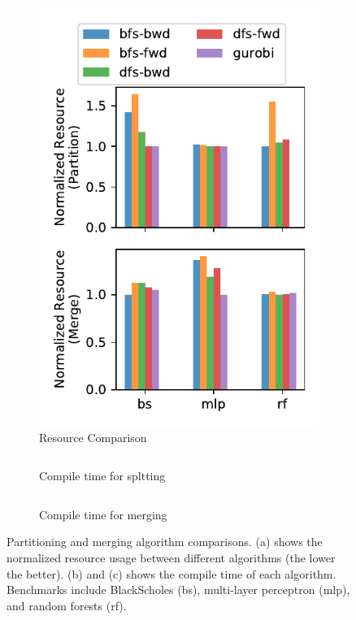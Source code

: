 \begin{figure}
\centering
\hfill
\begin{subfigure}[b]{0.35\textwidth}
\includegraphics[width=1\textwidth]{figs/algo2.pdf}
\caption{Resource Comparison}
\end{subfigure}
\hfill
\begin{subfigure}[b]{0.64\textwidth}
\centering
\begin{tabular}{lccccc}
  \toprule
  
 \bottomrule
\end{tabular}
\caption{
  Compile time for spltting
}
\vspace{0.1cm}
\begin{tabular}{lccccc}
  \toprule
  
 \bottomrule
\end{tabular}
\caption{
  Compile time for merging
}
\vspace{0.65cm}
\end{subfigure}
\hfill
\caption[Partitioning and merging algorithm comparisons]{
  Partitioning and merging algorithm comparisons. (a) shows the normalized resource usage between different algorithms (the lower the better). (b) and (c) shows the compile time of each algorithm.
  Benchmarks include BlackScholes (bs), multi-layer perceptron (mlp), and random forests (rf).
}
\label{fig:split}
\end{figure}

